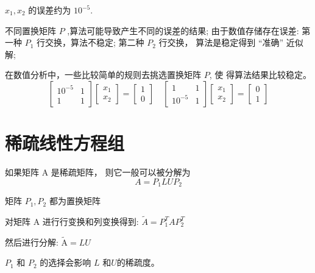 \begin{example}
    \begin{remark}
        $ x_{1}, x_{2} $ 的误差约为 $ 10^{-5} $.
    \end{remark}

\end{example}


不同置换矩阵 $ P $ ,算法可能导致产生不同的误差的结果; 由于数值存储存在误差:
第一种 $ P_{1} $ 行交换，算法不稳定;
第二种 $ P_{2} $ 行交换， 算法是稳定得到 “准确” 近似解;

在数值分析中，一些比较简单的规则去挑选置换矩阵 $ P  $, 使 得算法结果比较稳定。
\begin{equation}
    \left[\begin{array}{cc}
            10^{-5} & 1 \\
            1       & 1
        \end{array}\right]\left[\begin{array}{l}
            x_{1} \\
            x_{2}
        \end{array}\right]=\left[\begin{array}{l}
            1 \\
            0
        \end{array}\right] \quad\left[\begin{array}{cc}
            1       & 1 \\
            10^{-5} & 1
        \end{array}\right]\left[\begin{array}{l}
            x_{1} \\
            x_{2}
        \end{array}\right]=\left[\begin{array}{l}
            0 \\
            1
        \end{array}\right]
\end{equation}





\section{稀疏线性方程组}

\begin{theorem}
    如果矩阵 $ \mathrm{A} $ 是稀疏矩阵， 则它一般可以被分解为
    \begin{equation}
        A=P_{1} L U P_{2}
    \end{equation}

    矩阵 $ P_{1}, P_{2} $ 都为置换矩阵
\end{theorem}

\begin{corollary}
    对矩阵 $ \mathrm{A} $ 进行行变换和列变换得到: $ \tilde{A}=P_{1}^{T} A P_{2}^{T} $

    然后进行分解: $ \tilde{\mathrm{A}}=L U $
\end{corollary}



$ P_{1} $ 和 $ P_{2} $ 的选择会影响 $ {L} $ 和$U$的稀疏度。

